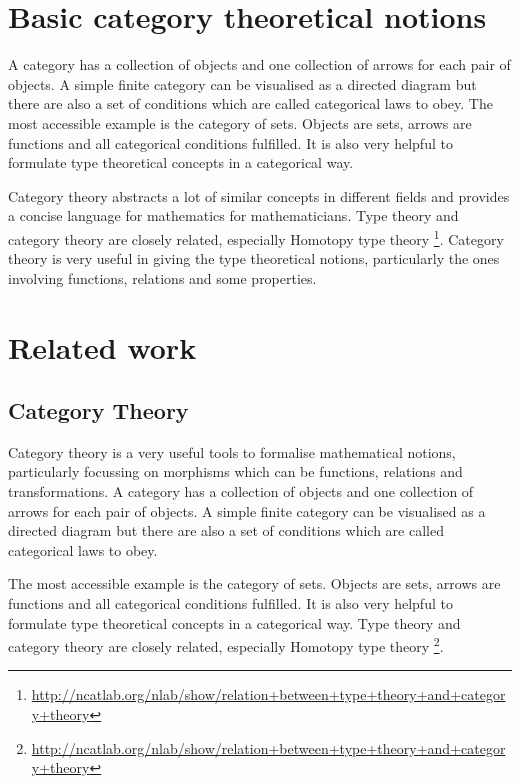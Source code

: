 \section{Basic category theoretical notions}

A category has a collection of objects and one collection of arrows
for each pair of objects. 
A simple finite category can be visualised as a directed diagram
 but there are also a set of conditions which are called categorical laws to obey. 
The most accessible example is the category of sets. Objects are sets,
arrows are functions and all categorical conditions fulfilled. It is
also very helpful to formulate type theoretical concepts in a
categorical way. 

Category theory abstracts a lot of similar concepts in different
fields and provides a concise language for mathematics for
mathematicians.
Type theory and category theory are closely related,
especially Homotopy type theory
\footnote{\url{http://ncatlab.org/nlab/show/relation+between+type+theory+and+category+theory}}.
Category theory is very useful in giving the type theoretical
notions, particularly the ones involving functions, relations and some
properties.




\section{Related work}






\subsection{Category Theory}

Category theory is a very useful tools to formalise mathematical notions, particularly focussing on morphisms which can be functions, relations and transformations.
A category has a collection of objects and one collection of arrows for each pair of objects. A simple finite category can be visualised as a directed diagram but there are also a set of conditions which are called categorical laws to obey. 

The most accessible example is the category of sets. Objects are sets, arrows are functions and all categorical conditions fulfilled. It is also very helpful to formulate type theoretical concepts in a categorical way. Type theory and category theory are closely related, especially Homotopy type theory \footnote{\url{http://ncatlab.org/nlab/show/relation+between+type+theory+and+category+theory}}.

